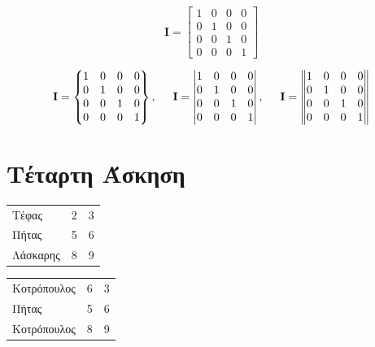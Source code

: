\documentclass{article}
\begin{document}
\begin{equation}
    \textbf{I} = \begin{bmatrix}
            1 & 0 & 0 & 0\\
            0 & 1 & 0 & 0\\
            0 & 0 & 1 & 0\\
            0 & 0 & 0 & 1
        \end{bmatrix}
\end{equation}

\begin{equation}
    \textbf{I} = \begin{Bmatrix}
            1 & 0 & 0 & 0\\
            0 & 1 & 0 & 0\\
            0 & 0 & 1 & 0\\
            0 & 0 & 0 & 1
        \end{Bmatrix}, \hspace{0.5cm}
    \textbf{I} = \begin{vmatrix}
            1 & 0 & 0 & 0\\
            0 & 1 & 0 & 0\\
            0 & 0 & 1 & 0\\
            0 & 0 & 0 & 1
        \end{vmatrix}, \hspace{0.5cm}
    \textbf{I} = \begin{Vmatrix}
            1 & 0 & 0 & 0\\
            0 & 1 & 0 & 0\\
            0 & 0 & 1 & 0\\
            0 & 0 & 0 & 1
        \end{Vmatrix}
\end{equation}


\section{Τέταρτη Άσκηση}

\begin{center}
\begin{tabular}{ l l l }
 Τέφας    & 2 & 3 \\ 
 Πήτας    & 5 & 6 \\
 Λάσκαρης & 8 & 9    
\end{tabular}
\end{center}

\begin{center}
\begin{tabular}{ | l | l | l |}
 Κοτρόπουλος    & 6 & 3 \\ 
 Πήτας          & 5 & 6 \\
 Κοτρόπουλος    & 8 & 9    
\end{tabular}
\end{center}
\end{document}
